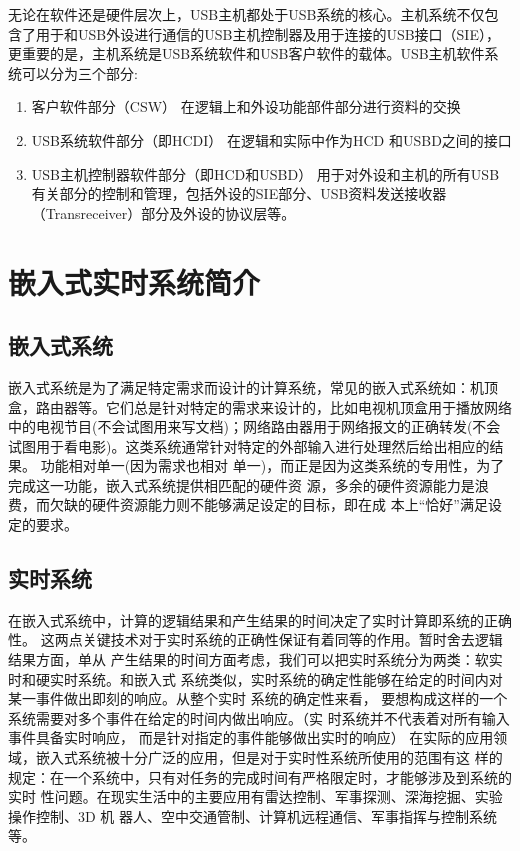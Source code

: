 无论在软件还是硬件层次上，USB主机都处于USB系统的核心。主机系统不仅包含了用于和USB外设进行通信的USB主机控制器及用于连接的USB接口（SIE），更重要的是，主机系统是USB系统软件和USB客户软件的载体。USB主机软件系统可以分为三个部分:
\begin{enumerate}
\item 客户软件部分（CSW）
在逻辑上和外设功能部件部分进行资料的交换

\item USB系统软件部分（即HCDI）
在逻辑和实际中作为HCD 和USBD之间的接口

\item USB主机控制器软件部分（即HCD和USBD）
用于对外设和主机的所有USB有关部分的控制和管理，包括外设的SIE部分、USB资料发送接收器（Transreceiver）部分及外设的协议层等。
\end{enumerate}

\section{嵌入式实时系统简介}

\subsection{嵌入式系统}
嵌入式系统是为了满足特定需求而设计的计算系统，常见的嵌入式系统如：机顶盒，路由器等。它们总是针对特定的需求来设计的，比如电视机顶盒用于播放网络中的电视节目(不会试图用来写文档)；网络路由器用于网络报文的正确转发(不会试图用于看电影)。这类系统通常针对特定的外部输入进行处理然后给出相应的结果。 功能相对单一(因为需求也相对
单一)，而正是因为这类系统的专用性，为了完成这一功能，嵌入式系统提供相匹配的硬件资
源，多余的硬件资源能力是浪费，而欠缺的硬件资源能力则不能够满足设定的目标，即在成
本上“恰好”满足设定的要求。
\subsection{实时系统}
在嵌入式系统中，计算的逻辑结果和产生结果的时间决定了实时计算即系统的正确性。
这两点关键技术对于实时系统的正确性保证有着同等的作用。暂时舍去逻辑结果方面，单从
产生结果的时间方面考虑，我们可以把实时系统分为两类：软实时和硬实时系统。和嵌入式
系统类似，实时系统的确定性能够在给定的时间内对某一事件做出即刻的响应。从整个实时
系统的确定性来看， 要想构成这样的一个系统需要对多个事件在给定的时间内做出响应。（实
时系统并不代表着对所有输入事件具备实时响应， 而是针对指定的事件能够做出实时的响应）
在实际的应用领域，嵌入式系统被十分广泛的应用，但是对于实时性系统所使用的范围有这
样的规定：在一个系统中，只有对任务的完成时间有严格限定时，才能够涉及到系统的实时
性问题。在现实生活中的主要应用有雷达控制、军事探测、深海挖掘、实验操作控制、3D 机
器人、空中交通管制、计算机远程通信、军事指挥与控制系统等。

